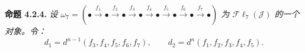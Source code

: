 \medskip\noindent\textbf{命题 4.2.4.}\quad
\textit{设
$\omega_7=(\mathord\bullet\xrightarrow{f_1}\mathord\bullet
\xrightarrow{f_2}\mathord\bullet\xrightarrow{f_3}\mathord\bullet
\xrightarrow{f_4}\mathord\bullet\xrightarrow{f_5}\mathord\bullet
\xrightarrow{f_6}\mathord\bullet\xrightarrow{f_7}\mathord\bullet)$
为 $\mathcal{F}\ell_7(\mathcal J)$ 的一个对象。令：}
\[
d_1=d^{n-1}(f_3,f_4,f_5,f_6,f_7),
\qquad
d_2=d^n(f_1,f_2,f_3,f_4,f_5).
\]
\endgroup
